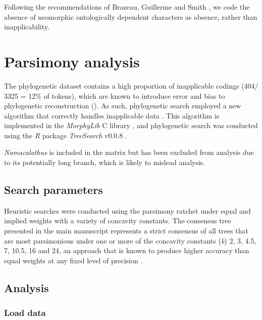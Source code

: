\documentclass[]{book}
\theoremstyle{definition}
\theoremstyle{definition}
\theoremstyle{definition}
\theoremstyle{remark}
\begin{document}
Following the recommendations of Brazeau, Guillerme and Smith
\citep[supplementary discussion]{Brazeau2018}, we code the absence of
neomorphic ontologically dependent characters \citep[sensu][]{Vogt2017}
as absence, rather than inapplicability.

\hypertarget{treesearch}{%
\chapter{Parsimony analysis}\label{treesearch}}

The phylogenetic dataset contains a high proportion of inapplicable
codings (404/ 3325 = 12\% of tokens), which are known to introduce error
and bias to phylogenetic reconstruction
(\citep{Maddison1993, Brazeau2018}). As such, phylogenetic search
employed a new algorithm that correctly handles inapplicable data
\citep{Brazeau2018}. This algorithm is implemented in the
\emph{MorphyLib} C library \citep{Brazeau2017Morphylib}, and
phylogenetic search was conducted using the \emph{R} package
\emph{TreeSearch} v0.0.8 \citep{Smith2018TreeSearch}.

\emph{Namacalathus} is included in the matrix but has been excluded from
analysis due to its potentially long branch, which is likely to mislead
analysis.

\hypertarget{search-parameters}{%
\section{Search parameters}\label{search-parameters}}

Heuristic searches were conducted using the parsimony ratchet
\citep{Nixon1999} under equal and implied weights \citep{Goloboff1997}
with a variety of concavity constants. The consensus tree presented in
the main manuscript represents a strict consensus of all trees that are
most parsimonious under one or more of the concavity constants
(\emph{k}) 2, 3, 4.5, 7, 10.5, 16 and 24, an approach that is known to
produce higher accuracy than equal weights at any fixed level of
precision \citep{Smith2017}.

\hypertarget{analysis}{%
\section{Analysis}\label{analysis}}

\hypertarget{load-data}{%
\subsection{Load data}\label{load-data}}
\end{document}
